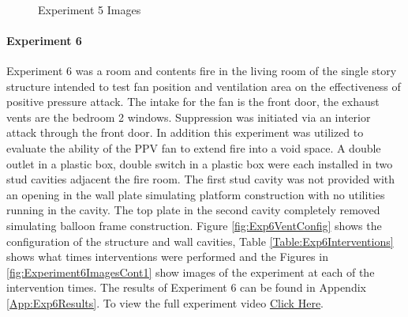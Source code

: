\documentclass{article}
\begin{document}
\begin{figure}[H]
	\ContinuedFloat 
	\centering 
	 \ 
	\caption{Experiment 5 Images}
	\label{fig:Experiment5ImagesCont3} 
\end{figure}

\clearpage

\paragraph{Experiment 6}\mbox{}

Experiment 6 was a room and contents fire in the living room of the single story structure intended to test fan position and ventilation area on the effectiveness of positive pressure attack. The intake for the fan is the front door, the exhaust vents are the bedroom 2 windows. Suppression was initiated via an interior attack through the front door. In addition this experiment was utilized to evaluate the ability of the PPV fan to extend fire into a void space. A double outlet in a plastic box, double switch in a plastic box were each installed in two stud cavities adjacent the fire room. The first stud cavity was not provided with an opening in the wall plate simulating platform construction with no utilities running in the cavity. The top plate in the second cavity completely removed simulating balloon frame construction. Figure \ref{fig:Exp6VentConfig} shows the configuration of the structure and wall cavities, Table \ref{Table:Exp6Interventions} shows what times interventions were performed and the Figures in \ref{fig:Experiment6ImagesCont1} show images of the experiment at each of the intervention times. The results of Experiment 6 can be found in Appendix \ref{App:Exp6Results}. To view the full experiment video \href{https://youtu.be/IDuoI21e-WI}{Click Here}.
\end{document}
